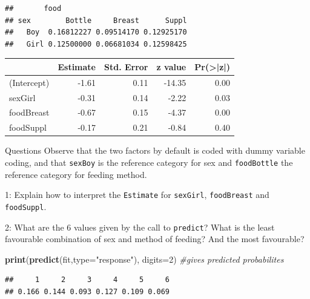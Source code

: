 \documentclass[
  ignorenonframetext,
]{beamer}
\newenvironment{Shaded}{\begin{snugshade}}{\end{snugshade}}
\newcommand{\AttributeTok}[1]{\textcolor[rgb]{0.13,0.29,0.53}{#1}}
\newcommand{\CommentTok}[1]{\textcolor[rgb]{0.56,0.35,0.01}{\textit{#1}}}
\newcommand{\DecValTok}[1]{\textcolor[rgb]{0.00,0.00,0.81}{#1}}
\newcommand{\FunctionTok}[1]{\textcolor[rgb]{0.13,0.29,0.53}{\textbf{#1}}}
\newcommand{\NormalTok}[1]{#1}
\newcommand{\StringTok}[1]{\textcolor[rgb]{0.31,0.60,0.02}{#1}}
\begin{document}
\begin{frame}[fragile]
\begin{verbatim}
##       food
## sex        Bottle     Breast      Suppl
##   Boy  0.16812227 0.09514170 0.12925170
##   Girl 0.12500000 0.06681034 0.12598425
\end{verbatim}
\end{frame}

\begin{frame}
\begin{tabular}{l|r|r|r|r}
\hline
  & Estimate & Std. Error & z value & Pr(>|z|)\\
\hline
(Intercept) & -1.61 & 0.11 & -14.35 & 0.00\\
\hline
sexGirl & -0.31 & 0.14 & -2.22 & 0.03\\
\hline
foodBreast & -0.67 & 0.15 & -4.37 & 0.00\\
\hline
foodSuppl & -0.17 & 0.21 & -0.84 & 0.40\\
\hline
\end{tabular}
\end{frame}

\begin{frame}[fragile]
\begin{block}{Questions}
\protect\hypertarget{questions}{}
Observe that the two factors by default is coded with dummy variable
coding, and that \texttt{sexBoy} is the reference category for sex and
\texttt{foodBottle} the reference category for feeding method.

1: Explain how to interpret the \texttt{Estimate} for \texttt{sexGirl},
\texttt{foodBreast} and \texttt{foodSuppl}.

2: What are the 6 values given by the call to \texttt{predict}? What is
the least favourable combination of sex and method of feeding? And the
most favourable?

\begin{Shaded}
\begin{Highlighting}[]
\FunctionTok{print}\NormalTok{(}\FunctionTok{predict}\NormalTok{(fit,}\AttributeTok{type=}\StringTok{"response"}\NormalTok{), }\AttributeTok{digits=}\DecValTok{2}\NormalTok{) }\CommentTok{\#gives predicted probabilites}
\end{Highlighting}
\end{Shaded}

\begin{verbatim}
##     1     2     3     4     5     6 
## 0.166 0.144 0.093 0.127 0.109 0.069
\end{verbatim}
\end{block}
\end{frame}
\end{document}

